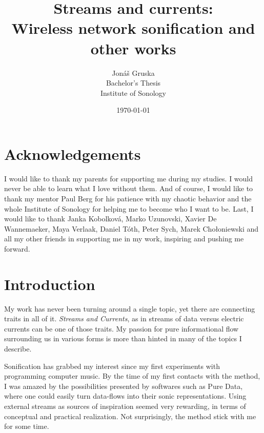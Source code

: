 \documentclass[12pt,a4paper,oneside]{report}
\title{Streams and currents:\\Wireless network sonification and other works}
\author{Jonáš Gruska\\
Bachelor's Thesis\\
Institute of Sonology}
\date{\today}
\begin{document}
\frenchspacing
\raggedbottom
{}       %

\maketitle

\begin{abstract}
\end{abstract}
\clearpage
\setcounter{page}{3}


\chapter*{Acknowledgements}
I would like to thank my parents for supporting me during my studies. I would never be able to learn what I love without them. And of course, I would like to thank my mentor Paul Berg for his patience with my chaotic behavior and the whole Institute of Sonology for helping me to become who I want to be. Last, I would like to thank Janka Kobolková, Marko Uzunovski, Xavier De Wannemaeker, Maya Verlaak, Daniel Tóth, Peter Sych, Marek Chołoniewski and all my other friends in supporting me in my work, inspiring and pushing me forward.

\setcounter{tocdepth}{1}
\tableofcontents


\chapter{Introduction}

My work has never been turning around a single topic, yet there are connecting traits in all of it. \emph{Streams and Currents}, as in streams of data versus electric currents can be one of those traits. My passion for pure informational flow surrounding us in various forms is more than hinted in many of the topics I describe.

Sonification has grabbed my interest since my first experiments with programming computer music. By the time of my first contacts with the method, I was amazed by the possibilities presented by softwares such as Pure Data, where one could easily turn data-flows into their sonic representations. Using external streams as sources of inspiration seemed very rewarding, in terms of conceptual and practical realization. Not surprisingly, the method stick with me for some time.
\end{document}
